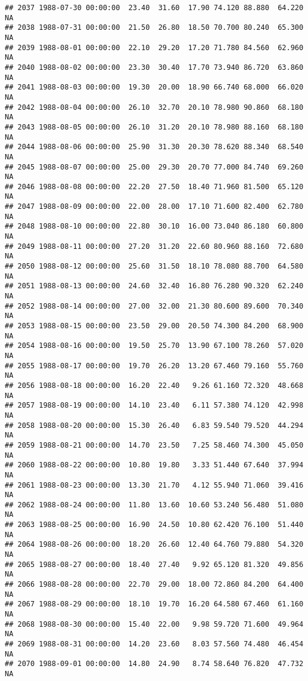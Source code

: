 \documentclass{article}\usepackage{graphicx, color}
\makeatletter
\newenvironment{kframe}{%
 \def\at@end@of@kframe{}%
 \ifinner\ifhmode%
  \def\at@end@of@kframe{\end{minipage}}%
  \begin{minipage}{\columnwidth}%
 \fi\fi%
 \def\FrameCommand##1{\hskip\@totalleftmargin \hskip-\fboxsep
 \colorbox{shadecolor}{##1}\hskip-\fboxsep
     \hskip-\linewidth \hskip-\@totalleftmargin \hskip\columnwidth}%
 \MakeFramed {\advance\hsize-\width
   \@totalleftmargin\z@ \linewidth\hsize
   \@setminipage}}%
 {\par\unskip\endMakeFramed%
 \at@end@of@kframe}
\newenvironment{knitrout}{}{} %
\makeatother
\begin{document}
\begin{knitrout}
\begin{kframe}
\begin{verbatim}
## 2037 1988-07-30 00:00:00  23.40  31.60  17.90 74.120 88.880  64.220     NA
## 2038 1988-07-31 00:00:00  21.50  26.80  18.50 70.700 80.240  65.300     NA
## 2039 1988-08-01 00:00:00  22.10  29.20  17.20 71.780 84.560  62.960     NA
## 2040 1988-08-02 00:00:00  23.30  30.40  17.70 73.940 86.720  63.860     NA
## 2041 1988-08-03 00:00:00  19.30  20.00  18.90 66.740 68.000  66.020     NA
## 2042 1988-08-04 00:00:00  26.10  32.70  20.10 78.980 90.860  68.180     NA
## 2043 1988-08-05 00:00:00  26.10  31.20  20.10 78.980 88.160  68.180     NA
## 2044 1988-08-06 00:00:00  25.90  31.30  20.30 78.620 88.340  68.540     NA
## 2045 1988-08-07 00:00:00  25.00  29.30  20.70 77.000 84.740  69.260     NA
## 2046 1988-08-08 00:00:00  22.20  27.50  18.40 71.960 81.500  65.120     NA
## 2047 1988-08-09 00:00:00  22.00  28.00  17.10 71.600 82.400  62.780     NA
## 2048 1988-08-10 00:00:00  22.80  30.10  16.00 73.040 86.180  60.800     NA
## 2049 1988-08-11 00:00:00  27.20  31.20  22.60 80.960 88.160  72.680     NA
## 2050 1988-08-12 00:00:00  25.60  31.50  18.10 78.080 88.700  64.580     NA
## 2051 1988-08-13 00:00:00  24.60  32.40  16.80 76.280 90.320  62.240     NA
## 2052 1988-08-14 00:00:00  27.00  32.00  21.30 80.600 89.600  70.340     NA
## 2053 1988-08-15 00:00:00  23.50  29.00  20.50 74.300 84.200  68.900     NA
## 2054 1988-08-16 00:00:00  19.50  25.70  13.90 67.100 78.260  57.020     NA
## 2055 1988-08-17 00:00:00  19.70  26.20  13.20 67.460 79.160  55.760     NA
## 2056 1988-08-18 00:00:00  16.20  22.40   9.26 61.160 72.320  48.668     NA
## 2057 1988-08-19 00:00:00  14.10  23.40   6.11 57.380 74.120  42.998     NA
## 2058 1988-08-20 00:00:00  15.30  26.40   6.83 59.540 79.520  44.294     NA
## 2059 1988-08-21 00:00:00  14.70  23.50   7.25 58.460 74.300  45.050     NA
## 2060 1988-08-22 00:00:00  10.80  19.80   3.33 51.440 67.640  37.994     NA
## 2061 1988-08-23 00:00:00  13.30  21.70   4.12 55.940 71.060  39.416     NA
## 2062 1988-08-24 00:00:00  11.80  13.60  10.60 53.240 56.480  51.080     NA
## 2063 1988-08-25 00:00:00  16.90  24.50  10.80 62.420 76.100  51.440     NA
## 2064 1988-08-26 00:00:00  18.20  26.60  12.40 64.760 79.880  54.320     NA
## 2065 1988-08-27 00:00:00  18.40  27.40   9.92 65.120 81.320  49.856     NA
## 2066 1988-08-28 00:00:00  22.70  29.00  18.00 72.860 84.200  64.400     NA
## 2067 1988-08-29 00:00:00  18.10  19.70  16.20 64.580 67.460  61.160     NA
## 2068 1988-08-30 00:00:00  15.40  22.00   9.98 59.720 71.600  49.964     NA
## 2069 1988-08-31 00:00:00  14.20  23.60   8.03 57.560 74.480  46.454     NA
## 2070 1988-09-01 00:00:00  14.80  24.90   8.74 58.640 76.820  47.732     NA

\end{verbatim}
\end{kframe}
\end{knitrout}
\end{document}
